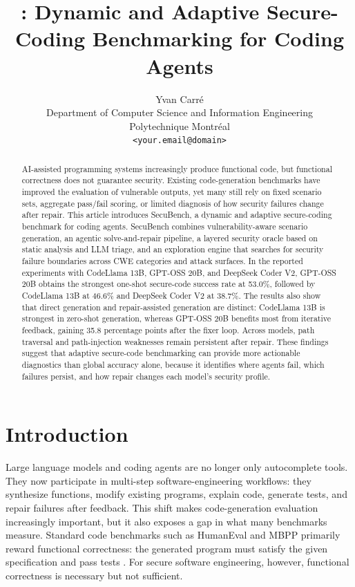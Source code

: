 \documentclass[11pt]{article}
\title{\toolname: Dynamic and Adaptive Secure-Coding Benchmarking for Coding Agents}
\author{
Yvan Carré\\
Department of Computer Science and Information Engineering\\
Polytechnique Montréal\\
\texttt{<your.email@domain>}
}
\date{}
\newcommand{\toolname}{SecuBench}
\newcommand{\pp}{percentage points}
\begin{document}
\maketitle


\begin{abstract}
AI-assisted programming systems increasingly produce functional code, but functional correctness does not guarantee security. Existing code-generation benchmarks have improved the evaluation of vulnerable outputs, yet many still rely on fixed scenario sets, aggregate pass/fail scoring, or limited diagnosis of how security failures change after repair. This article introduces \toolname{}, a dynamic and adaptive secure-coding benchmark for coding agents. \toolname{} combines vulnerability-aware scenario generation, an agentic solve-and-repair pipeline, a layered security oracle based on static analysis and LLM triage, and an exploration engine that searches for security failure boundaries across CWE categories and attack surfaces. In the reported experiments with CodeLlama 13B, GPT-OSS 20B, and DeepSeek Coder V2, GPT-OSS 20B obtains the strongest one-shot secure-code success rate at 53.0\%, followed by CodeLlama 13B at 46.6\% and DeepSeek Coder V2 at 38.7\%. The results also show that direct generation and repair-assisted generation are distinct: CodeLlama 13B is strongest in zero-shot generation, whereas GPT-OSS 20B benefits most from iterative feedback, gaining 35.8 \pp{} after the fixer loop. Across models, path traversal and path-injection weaknesses remain persistent after repair. These findings suggest that adaptive secure-code benchmarking can provide more actionable diagnostics than global accuracy alone, because it identifies where agents fail, which failures persist, and how repair changes each model's security profile.
\end{abstract}


\section{Introduction}

Large language models and coding agents are no longer only autocomplete tools. They now participate in multi-step software-engineering workflows: they synthesize functions, modify existing programs, explain code, generate tests, and repair failures after feedback. This shift makes code-generation evaluation increasingly important, but it also exposes a gap in what many benchmarks measure. Standard code benchmarks such as HumanEval and MBPP primarily reward functional correctness: the generated program must satisfy the given specification and pass tests \cite{chen2021codex,austin2021programsynthesis}. For secure software engineering, however, functional correctness is necessary but not sufficient.
\end{document}

